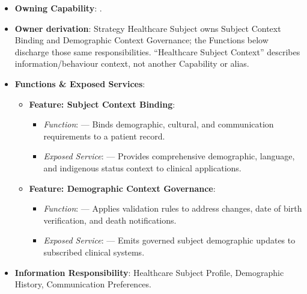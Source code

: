 \begin{itemize}

\item 
\textbf{Owning Capability}: \texttt{}.



\item 
\textbf{Owner derivation}: Strategy Healthcare Subject owns Subject Context Binding and Demographic Context Governance; the Functions below discharge those same responsibilities. “Healthcare Subject Context” describes information/\allowbreak{}behaviour context, not another Capability or alias.



\item 
\textbf{Functions \& Exposed Services}:


\begin{itemize}

\item 
\textbf{Feature: Subject Context Binding}:


\begin{itemize}

\item 
\emph{Function}: \texttt{} — Binds demographic, cultural, and communication requirements to a patient record.



\item 
\emph{Exposed Service}: \texttt{} — Provides comprehensive demographic, language, and indigenous status context to clinical applications.



\end{itemize}


\item 
\textbf{Feature: Demographic Context Governance}:


\begin{itemize}

\item 
\emph{Function}: \texttt{} — Applies validation rules to address changes, date of birth verification, and death notifications.



\item 
\emph{Exposed Service}: \texttt{} — Emits governed subject demographic updates to subscribed clinical systems.



\end{itemize}


\end{itemize}


\item 
\textbf{Information Responsibility}: Healthcare Subject Profile, Demographic History, Communication Preferences.



\end{itemize}
\label{rad:em:52}

